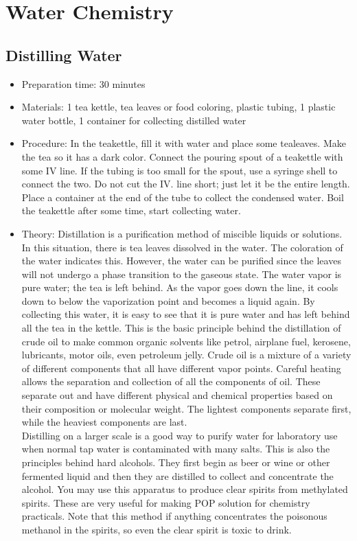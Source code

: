 \section{Water Chemistry}

\subsection{Distilling Water}
\label{sub:distillwater}
\begin{itemize}
\item{Preparation time: 30 minutes}
\item{Materials: 1 tea kettle, tea leaves or food coloring, plastic tubing, 1 plastic water bottle, 1 container for collecting distilled water}
\item{Procedure: In the teakettle, fill it with water and place some tealeaves. Make the tea so it has a dark color. Connect the pouring spout of a teakettle with some IV line. If the tubing is too small for the spout, use a syringe shell to connect the two. Do not cut the IV. line short; just let it be the entire length. Place a container at the end of the tube to collect the condensed water. Boil the teakettle after some time, start collecting water.}
\item{Theory: Distillation is a purification method of miscible liquids or solutions. In this situation, there is tea leaves dissolved in the water. The coloration of the water indicates this. However, the water can be purified since the leaves will not undergo a phase transition to the gaseous state. The water vapor is pure water; the tea is left behind. As the vapor goes down the line, it cools down to below the vaporization point and becomes a liquid again. By collecting this water, it is easy to see that it is pure water and has left behind all the tea in the kettle. This is the basic principle behind the distillation of crude oil to make common organic solvents like petrol, airplane fuel, kerosene, lubricants, motor oils, even petroleum jelly. Crude oil is a mixture of a variety of different components that all have different vapor points. Careful heating allows the separation and collection of all the components of oil. These separate out and have different physical and chemical properties based on their composition or molecular weight. The lightest components separate first, while the heaviest components are last.\\
Distilling on a larger scale is a good way to purify water for laboratory use when normal tap water is contaminated with many salts. This is also the principles behind hard alcohols. They first begin as beer or wine or other fermented liquid and then they are distilled to collect and concentrate the alcohol. You may use this apparatus to produce clear spirits from methylated spirits. These are very useful for making POP solution for chemistry practicals. Note that this method if anything concentrates the poisonous methanol in the spirits, so even the clear spirit is toxic to drink.}
\end{itemize}

